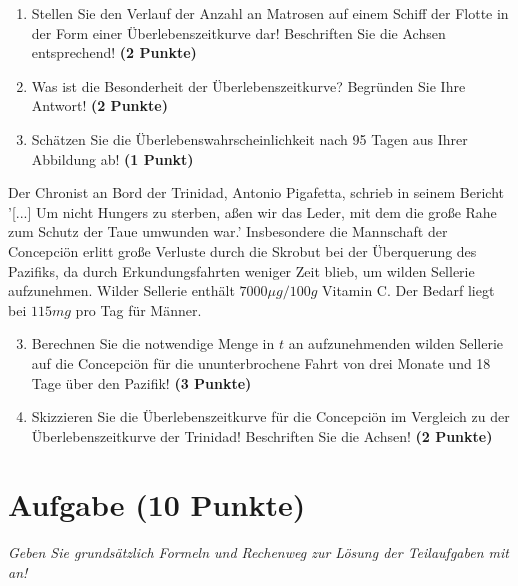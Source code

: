\documentclass[a4paper, 9pt]{scrartcl}\usepackage[]{graphicx}\usepackage[]{xcolor}
\begin{document}
\begin{enumerate}
\item Stellen Sie den Verlauf der Anzahl an Matrosen auf einem Schiff der Flotte in der Form einer Überlebenszeitkurve dar! Beschriften Sie die Achsen entsprechend! \textbf{(2 Punkte)} 
\item Was ist die Besonderheit der Überlebenszeitkurve? Begründen Sie Ihre Antwort! \textbf{(2 Punkte)} 
\item Schätzen Sie die Überlebenswahrscheinlichkeit nach 95 Tagen aus Ihrer Abbildung ab! \textbf{(1 Punkt)} 
\end{enumerate}

Der Chronist an Bord der Trinidad, Antonio Pigafetta, schrieb in seinem Bericht '[...] Um nicht Hungers zu sterben, aßen wir das Leder, mit dem die große Rahe zum Schutz der Taue umwunden war.' Insbesondere die Mannschaft der Concepciön erlitt große Verluste durch die Skrobut bei der Überquerung des Pazifiks, da durch Erkundungsfahrten weniger Zeit blieb, um wilden Sellerie aufzunehmen. Wilder Sellerie enthält $7000\mu g/100g$ Vitamin C. Der Bedarf liegt bei $115mg$ pro Tag für Männer.

\begin{enumerate}
  \setcounter{enumi}{2}
\item Berechnen Sie die notwendige Menge in $t$ an aufzunehmenden wilden Sellerie auf die Concepciön für die ununterbrochene Fahrt von drei Monate und 18 Tage über den Pazifik! \textbf{(3 Punkte)}
\item Skizzieren Sie die Überlebenszeitkurve für die Concepciön im Vergleich zu der Überlebenszeitkurve der Trinidad! Beschriften Sie die Achsen! \textbf{(2 Punkte)}
\end{enumerate}

 
\clearpage

\section{Aufgabe \hfill (10 Punkte)}

\textit{Geben Sie grundsätzlich Formeln und Rechenweg zur Lösung der Teilaufgaben mit an!} \\[1Ex]
 
\end{document}
